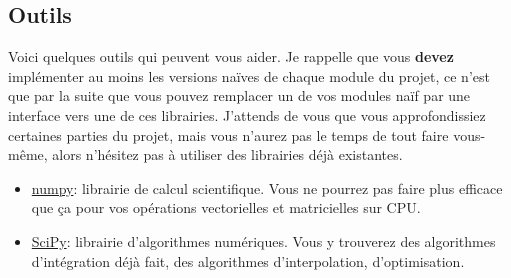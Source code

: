 \documentclass{article}
\begin{document}
\subsection{Outils}
\label{outils}

Voici quelques outils qui peuvent vous aider. Je rappelle que vous \textbf{devez} implémenter au moins les versions naïves de chaque module du projet, ce n'est que par la suite que vous pouvez remplacer un de vos modules naïf par une interface vers une de ces librairies. J'attends de vous que vous approfondissiez certaines parties du projet, mais vous n'aurez pas le temps de tout faire vous-même, alors n'hésitez pas à utiliser des librairies déjà existantes.
\begin{itemize}
    \item \href{https://numpy.org/}{numpy}: librairie de calcul scientifique. Vous ne pourrez pas faire plus efficace que ça pour vos opérations vectorielles et matricielles sur CPU.
    \item \href{https://docs.scipy.org/doc/scipy/reference/}{SciPy}: librairie d'algorithmes numériques. Vous y trouverez des algorithmes d'intégration déjà fait, des algorithmes d'interpolation, d'optimisation.
\end{itemize}
\end{document}
